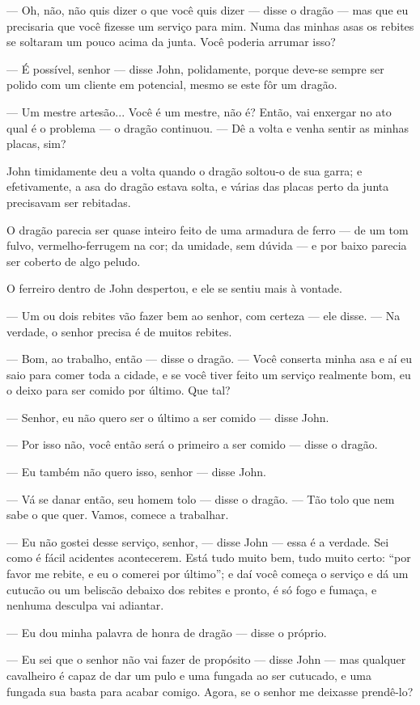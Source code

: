 — Oh, não, não quis dizer o que você quis dizer — disse o dragão — mas
que eu precisaria que você fizesse um serviço para mim. Numa das
minhas asas os rebites se soltaram um pouco acima da junta. Você
poderia arrumar isso?

— É possível, senhor — disse John, polidamente, porque deve-se sempre
ser polido com um cliente em potencial, mesmo se este fôr um dragão.

— Um mestre artesão... Você é um mestre, não é? Então, vai enxergar no
ato qual é o problema — o dragão continuou. — Dê a volta e venha
sentir as minhas placas, sim?

John timidamente deu a volta quando o dragão soltou-o de sua garra; e
efetivamente, a asa do dragão estava solta, e várias das placas perto
da junta precisavam ser rebitadas. 

O dragão parecia ser quase inteiro feito de uma armadura de ferro — de
um tom fulvo, vermelho-ferrugem na cor; da umidade, sem dúvida — e
por baixo parecia ser coberto de algo peludo. 

O ferreiro dentro de John despertou, e ele se sentiu mais à vontade. 

— Um ou dois rebites vão fazer bem ao senhor, com certeza — ele disse.
— Na verdade, o senhor precisa é de muitos rebites.

— Bom, ao trabalho, então — disse o dragão. — Você conserta minha asa
e aí eu saio para comer toda a cidade, e se você tiver feito um
serviço realmente bom, eu o deixo para ser comido por último. Que
tal?

— Senhor, eu não quero ser o último a ser comido — disse John.

— Por isso não, você então será o primeiro a ser comido — disse o
dragão.

— Eu também não quero isso, senhor — disse John.

— Vá se danar então, seu homem tolo — disse o dragão. — Tão tolo que
nem sabe o que quer. Vamos, comece a trabalhar.

— Eu não gostei desse serviço, senhor, — disse John — essa é a
verdade. Sei como é fácil acidentes acontecerem. Está tudo muito bem,
tudo muito certo: “por favor me rebite, e eu o comerei por último”; e
daí você começa o serviço e dá um cutucão ou um beliscão debaixo dos
rebites e pronto, é só fogo e fumaça, e nenhuma desculpa vai
adiantar. 

— Eu dou minha palavra de honra de dragão — disse o próprio.

— Eu sei que o senhor não vai fazer de propósito — disse John — mas
qualquer cavalheiro é capaz de dar um pulo e uma fungada ao ser
cutucado, e uma fungada sua basta para acabar comigo. Agora, se o
senhor me deixasse prendê-lo?

